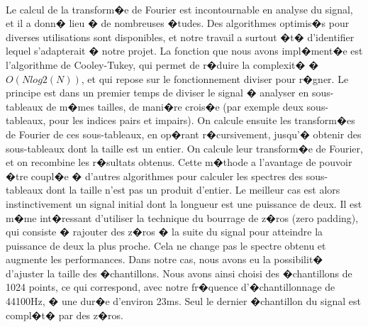 {		\paragraph{}
	Le calcul de la transform�e de Fourier est incontournable en analyse du signal, et il a donn� lieu � de nombreuses �tudes. 
	Des algorithmes optimis�s pour diverses utilisations sont disponibles, et notre travail a surtout �t� d'identifier lequel s'adapterait 
	� notre projet. La fonction que nous avons impl�ment�e est l'algorithme de Cooley-Tukey, qui permet de r�duire la complexit� � $O(Nlog2(N))$, 
	et qui repose sur le fonctionnement diviser pour r�gner.  Le principe est dans un premier temps de diviser le signal 
	� analyser en sous-tableaux de m�mes tailles, de mani�re crois�e (par exemple deux sous-tableaux, pour les indices 
	pairs et impairs). On calcule ensuite les transform�es de Fourier de ces sous-tableaux, en op�rant r�cursivement, 
	jusqu'� obtenir des sous-tableaux dont la taille est un entier. On calcule leur transform�e de Fourier, et on recombine 
	les r�sultats obtenus. Cette m�thode a l'avantage de pouvoir �tre coupl�e � d'autres algorithmes pour calculer les 
	spectres des sous-tableaux dont la taille n'est pas un produit d'entier. Le meilleur cas est alors instinctivement un 
	signal initial dont la longueur est une puissance de deux. Il est m�me int�ressant d'utiliser la technique du bourrage 
	de z�ros (zero padding), qui consiste � rajouter des z�ros � la suite du signal pour atteindre la puissance de deux la 
	plus proche. Cela ne change pas le spectre obtenu et augmente les performances. Dans notre cas, nous avons eu 
	la possibilit� d'ajuster la taille des �chantillons. Nous avons ainsi choisi des �chantillons de 1024 points, ce qui 
	correspond, avec notre fr�quence d'�chantillonnage de 44100Hz, � une dur�e d'environ 23ms. Seul le dernier �chantillon du signal est compl�t� par des z�ros.
}
